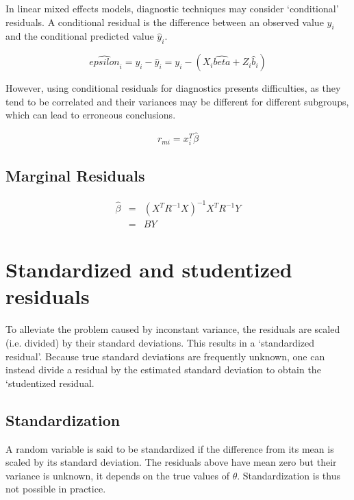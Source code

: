 \documentclass[Main.tex]{subfiles}
\begin{document}
In linear mixed effects models, diagnostic techniques may consider `conditional' residuals. A conditional residual is the difference between an observed value $y_{i}$ and the conditional predicted value $\hat{y}_{i} $.

\[ \hat{epsilon}_{i} = y_{i} - \hat{y}_{i} = y_{i} - ( X_{i}\hat{beta} + Z_{i}\hat{b}_{i}) \]

However, using conditional residuals for diagnostics presents difficulties, as they tend to be correlated and their variances may be different for different subgroups, which can lead to erroneous conclusions.







\begin{equation}
r_{mi}=x^{T}_{i}\hat{\beta}
\end{equation}

\subsection{Marginal Residuals}
\begin{eqnarray}
\hat{\beta} &=& (X^{T}R^{-1}X)^{-1}X^{T}R^{-1}Y \nonumber \\
&=& BY \nonumber
\end{eqnarray}
\newpage
\section{Standardized and studentized residuals} %

To alleviate the problem caused by inconstant variance, the residuals are scaled (i.e. divided) by their standard deviations. This results in a `standardized residual'. Because true standard deviations are frequently unknown, one can instead divide a residual by the estimated standard deviation to obtain the `studentized residual. 

\subsection{Standardization} %

A random variable is said to be standardized if the difference from its mean is scaled by its standard deviation. The residuals above have mean zero but their variance is unknown, it depends on the true values of $\theta$. Standardization is thus not possible in practice.
\end{document}
